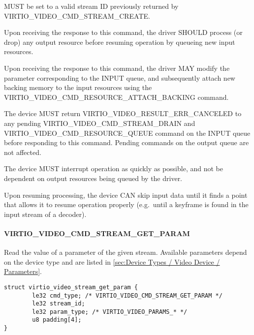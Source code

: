 
 MUST be set to a valid stream ID previously returned
by VIRTIO\_VIDEO\_CMD\_STREAM\_CREATE.

Upon receiving the response to this command, the driver SHOULD process
(or drop) any output resource before resuming operation by queueing new
input resources.

Upon receiving the response to this command, the driver MAY modify the
 parameter corresponding to
the INPUT queue, and subsequently attach new backing memory to the input
resources using the VIRTIO\_VIDEO\_CMD\_RESOURCE\_ATTACH\_BACKING
command.


The device MUST return VIRTIO\_VIDEO\_RESULT\_ERR\_CANCELED to any
pending VIRTIO\_VIDEO\_CMD\_STREAM\_DRAIN and
VIRTIO\_VIDEO\_CMD\_RESOURCE\_QUEUE command on the INPUT queue before
responding to this command. Pending commands on the output queue are not
affected.

The device MUST interrupt operation as quickly as possible, and not be
dependent on output resources being queued by the driver.

Upon resuming processing, the device CAN skip input data until it finds
a point that allows it to resume operation properly (e.g.~until a
keyframe is found in the input stream of a decoder).

\paragraph{VIRTIO_VIDEO_CMD_STREAM_GET_PARAM}\label{sec:Device Types / Video Device / Device Operation / Device Operation: Stream commands / VIRTIO_VIDEO_CMD_STREAM_GET_PARAM}

Read the value of a parameter of the given stream. Available parameters
depend on the device type and are listed in
\ref{sec:Device Types / Video Device / Parameters}.

\begin{lstlisting}
struct virtio_video_stream_get_param {
        le32 cmd_type; /* VIRTIO_VIDEO_CMD_STREAM_GET_PARAM */
        le32 stream_id;
        le32 param_type; /* VIRTIO_VIDEO_PARAMS_* */
        u8 padding[4];
}
\end{lstlisting}

